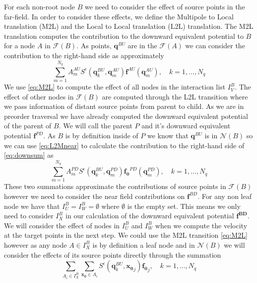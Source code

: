 For each non-root node $B$ we need to consider the effect of source points in the far-field. In order to consider these effects, we define the Multipole to Local translation (M2L) and the Local to Local translation (L2L) translation. The M2L translation computes the contribution to the downward equivalent potential to $B$ for a node $A$ in $\mathcal{F}(B)$. As points, $\mathbf{q}^{BU}$ are in the $\mathcal{F}(A)$ we can consider the contribution to the right-hand side as approximately 
\begin{equation}
\label{eq:M2L}
\sum_{m=1}^{N_{q}} A_{m}^{A U} S^\epsilon\left(\mathbf{q}_{k}^{B U}, \mathbf{q}_{m}^{A U}\right) \mathbf{f}^{A U}\left(\mathbf{q}_{m}^{A U}\right), \quad k=1,\dots,N_q
\end{equation}
We use \cref{eq:M2L} to compute the effect of all nodes in the interaction list $I_V^B$. The effect of other nodes in $\mathcal{F}(B)$ are computed through the L2L transition where we pass information of distant source points from parent to child. As we are in preorder traversal we have already computed the downward equivalent potential of the parent of $B$. We will call the parent $P$ and it's downward equivalent potential $\mathbf{f}^{PD}$. As $B$ is by definition inside of $P$ we know that $\mathbf{q}^{BU}$ is in $\mathcal{N}(B)$ so we can use \cref{eq:L2Mnear} to calculate the contribution to the right-hand side of \cref{eq:downsum} as
\begin{equation}
\label{eq:L2L}
\sum_{m=1}^{N_{q}} A_{m}^{P D} S^\epsilon\left(\mathbf{q}_{k}^{B U}, \mathbf{q}_{m}^{P D}\right) \mathbf{f_0}^{P D}\left(\mathbf{q}_{m}^{P D}\right), \quad k=1,\dots,N_q
\end{equation}
These two summations approximate the contributions of source points in $\mathcal{F}(B)$ however we need to consider the near field contributions on $\mathbf{f}^{B D}$. For any non leaf node we have that $I_U^B = I_W^B = \emptyset$ where $\emptyset$ is the empty set. This means we only need to consider $I_X^B$ in our calculation of the downward equivalent potential $\mathbf{f^{BD}}$. We will consider the effect of nodes in $I_U^B$ and $I_W^B$ when we compute the velocity at the target points in the next step. We could use the M2L transition \cref{eq:M2L} however as any node $A \in I_X^B$ is by definition a leaf node and in $\mathcal{N}(B)$ we will consider the effects of its source points directly through the summation
\begin{equation}
\label{eq:X}
    \sum_{A_i \in I_X^B} \sum_{\mathbf{x_0}\in A_i} S^\epsilon\left(\mathbf{q}^{BU}_{k}, \mathbf{x_0}_{j}\right) \mathbf{f_0}_{j}, \quad k=1,\dots,N_q
\end{equation}

